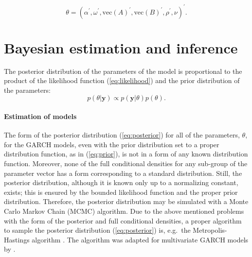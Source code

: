 \documentclass[final,3p,authoryear]{elsarticle}
\begin{document}
\begin{equation}\label{eq:theta}
\theta = \left( \alpha^{\prime}, \omega^{\prime},\text{vec}(A)^{\prime}, \text{vec}(B)^{\prime}, \rho^{\prime}, \nu \right)^{\prime}.
\end{equation}

 
 
 
 
 
 
 
 
\section{Bayesian estimation and inference}\label{sec:estimation}

\noindent The posterior distribution of the parameters of the model is proportional to the product of the likelihood function (\ref{eq:likelihood}) and the prior distribution of the parameters:
\begin{equation}\label{eq:posterior}
p(\theta|\mathbf{y}) \propto p(\mathbf{y}|\theta)p(\theta).
\end{equation}
 
\paragraph{Estimation of models} The form of the posterior distribution (\ref{eq:posterior}) for all of the parameters, $\theta$, for the GARCH models, even with the prior distribution set to a proper distribution function, as in (\ref{eq:prior}), is not in a form of  any known distribution function. Moreover, none of the full conditional densities for any sub-group of the parameter vector has a form corresponding to a standard distribution. Still, the posterior distribution, although it is known only up to a normalizing constant, exists; this is ensured by the bounded likelihood function and the proper prior distribution. Therefore, the posterior distribution may be simulated with a Monte Carlo Markov Chain (MCMC) algorithm. Due to the above mentioned problems with the form of the posterior and full conditional densities, a proper algorithm to sample the posterior distribution (\ref{eq:posterior}) is, e.g.\ the Metropolis-Hastings algorithm \citep[see][and references therein]{Chib1995}. The algorithm was adapted for multivariate GARCH models by \cite{Vrontos2003}.
\end{document}
